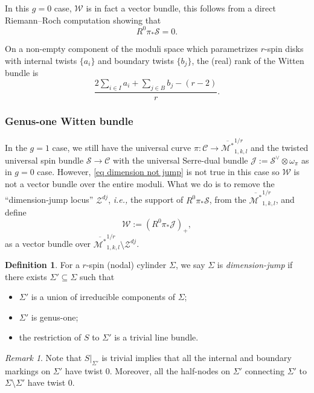 \documentclass[11pt]{amsart}
\theoremstyle{definition}
\newtheorem{dfn}[dummy]{Definition}
\theoremstyle{remark}
\newtheorem{rmk}[dummy]{Remark}
\newcommand{\<}{\left<}
\renewcommand{\>}{\right>}
\numberwithin{equation}{section}
\def\Mbarstar{{\overline{\mathcal M^*}}}
\begin{document}
In this $g=0$ case, $\mathcal W$ is in fact a %
vector bundle, this %
follows from a direct Riemann--Roch computation showing that 
\begin{equation}\label{eq dimension not jump}
    R^0\pi_*\mathcal{S}=0.
\end{equation}




 On a non-empty component of the moduli space which parametrizes $r$-spin disks with internal twists $\{a_i\}$ and boundary twists $\{b_j\}$, the (real) rank of the Witten bundle is
\begin{equation}\label{eq rank of witten bundle}\frac{2 \sum_{i\in I} a_i + \sum_{j\in B} b_j - (r-2)}{r}.\end{equation}


\subsubsection{Genus-one Witten bundle}
In the $g=1$ case, we still have  the universal curve $\pi: \mathcal{C} \to \Mbarstar_{1,k,l}^{1/r}$ and the twisted universal spin bundle $\mathcal{S} \to \mathcal{C}$   with the universal Serre-dual bundle 
$\mathcal{J}:= \mathcal{S}^{\vee} \otimes \omega_{\pi}$
as in $g=0$ case. However,
\eqref{eq dimension not jump} is not true in this case so $\mathcal W$ is not a vector bundle over the entire moduli. What we do is to remove the ``dimension-jump locus'' $\mathcal Z^{dj}$, \textit{i.e.,} the support of $R^0\pi_*\mathcal S$,  from the %
$\Mbarstar_{1,k,l}^{1/r}$, and %
define 
\begin{equation*}
{\mathcal{W}}:= (R^0\pi_*\mathcal{J})_+,
\end{equation*}
as %
a vector bundle over $\Mbarstar_{1,k,l}^{1/r}\setminus \mathcal Z^{dj}$. 

\begin{dfn}
    For a $r$-spin (nodal) cylinder $\Sigma$, we say $\Sigma$ is \textit{dimension-jump} if there exists $\Sigma'\subseteq \Sigma$ such that
    \begin{itemize}
        \item $\Sigma'$ is a union of irreducible components of $\Sigma$;
        \item $\Sigma'$ is genus-one;
        \item the restriction of $S$ to $\Sigma'$ is a trivial line bundle.
    \end{itemize}
\end{dfn}
\begin{rmk}
    Note that $S\vert_{\Sigma'}$ is trivial implies that all the internal and boundary markings on $\Sigma'$ have twist $0$. Moreover, all the half-nodes on $\Sigma'$ connecting $\Sigma'$ to $\Sigma\setminus\Sigma'$ have twist $0$.
\end{rmk}
\end{document}
